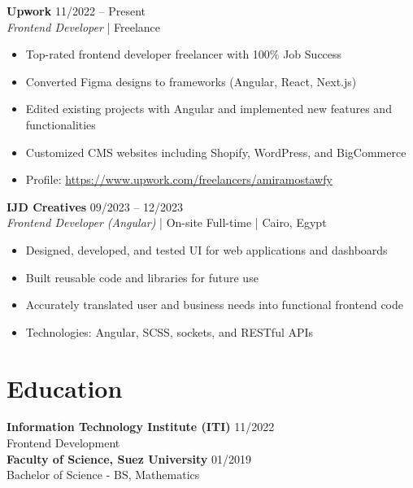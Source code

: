 \documentclass[11pt,a4paper]{article}
\begin{document}
\vspace{0.2cm}

\noindent\textbf{Upwork} \hfill 11/2022 -- Present\\
\textit{Frontend Developer} | Freelance\\
\vspace{-1em}
\begin{itemize}
    \item Top-rated frontend developer freelancer with 100\% Job Success
    \item Converted Figma designs to frameworks (Angular, React, Next.js)
    \item Edited existing projects with Angular and implemented new features and functionalities
    \item Customized CMS websites including Shopify, WordPress, and BigCommerce
    \item Profile: \url{https://www.upwork.com/freelancers/amiramostawfy}
\end{itemize}

\vspace{0.2cm}

\noindent\textbf{IJD Creatives} \hfill 09/2023 -- 12/2023\\
\textit{Frontend Developer (Angular)} | On-site Full-time | Cairo, Egypt\\
\vspace{-1em}
\begin{itemize}
    \item Designed, developed, and tested UI for web applications and dashboards
    \item Built reusable code and libraries for future use
    \item Accurately translated user and business needs into functional frontend code
    \item Technologies: Angular, SCSS, sockets, and RESTful APIs
\end{itemize}

\section*{Education}
\noindent\textbf{Information Technology Institute (ITI)} \hfill 11/2022\\
Frontend Development\\

\noindent\textbf{Faculty of Science, Suez University} \hfill 01/2019\\
Bachelor of Science - BS, Mathematics\\
\end{document}
